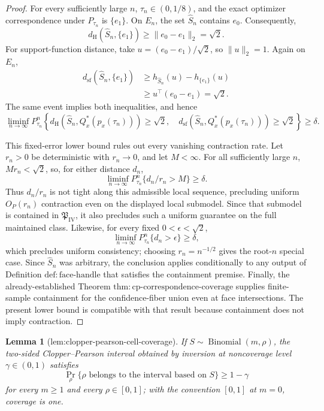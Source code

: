 \documentclass{article}
\newtheorem{lemma}{Lemma}
\begin{document}
\begin{proof}
For every sufficiently large \(n\), \(\tau_n\in(0,1/8)\), and the exact optimizer correspondence under \(P_{\tau_n}\) is \(\{e_1\}\).  On \(E_n\), the set \(\widehat S_n\) contains \(e_0\).  Consequently,
\[
 d_{\mathrm H}(\widehat S_n,\{e_1\})
 \geq\lVert e_0-e_1\rVert_2=\sqrt2.
\]
For support-function distance, take \(u=(e_0-e_1)/\sqrt2\), so \(\lVert u\rVert_2=1\).  Again on \(E_n\),
\[
 \begin{aligned}
 d_{\mathrm{sf}}(\widehat S_n,\{e_1\})
 &\geq h_{\widehat S_n}(u)-h_{\{e_1\}}(u)\\
 &\geq u^\top(e_0-e_1)=\sqrt2.
 \end{aligned}
\]
The same event implies both inequalities, and hence
\[
 \liminf_{n\to\infty}P_{\tau_n}^n\!\left\{
 d_{\mathrm H}(\widehat S_n,Q_x^*(p_x(\tau_n)))\geq\sqrt2,
 \quad
 d_{\mathrm{sf}}(\widehat S_n,Q_x^*(p_x(\tau_n)))\geq\sqrt2
 \right\}\geq\delta.
\]

This fixed-error lower bound rules out every vanishing contraction rate.  Let \(r_n>0\) be deterministic with \(r_n\to0\), and let \(M<\infty\).  For all sufficiently large \(n\), \(Mr_n<\sqrt2\), so, for either distance \(d_n\),
\[
 \liminf_{n\to\infty}P_{\tau_n}^n\{d_n/r_n>M\}\geq\delta.
\]
Thus \(d_n/r_n\) is not tight along this admissible local sequence, precluding uniform \(O_P(r_n)\) contraction even on the displayed local submodel.  Since that submodel is contained in \(\mathfrak P_{\mathrm{IV}}\), it also precludes such a uniform guarantee on the full maintained class.  Likewise, for every fixed \(0<\epsilon<\sqrt2\),
\[
 \liminf_{n\to\infty}P_{\tau_n}^n\{d_n>\epsilon\}\geq\delta,
\]
which precludes uniform consistency; choosing \(r_n=n^{-1/2}\) gives the root-\(n\) special case.  Since \(\widehat S_n\) was arbitrary, the conclusion applies conditionally to any output of Definition \(\mathrm{def{:}face\text{-}handle}\) that satisfies the containment premise.  Finally, the already-established Theorem \(\mathrm{thm{:}cp\text{-}correspondence\text{-}coverage}\) supplies finite-sample containment for the confidence-fiber union even at face intersections.  The present lower bound is compatible with that result because containment does not imply contraction.
\end{proof}

\begin{lemma}[lem:clopper-pearson-cell-coverage]\label{lem:clopper-pearson-cell-coverage}
If \(S\sim\operatorname{Binomial}(m,\rho)\), the two-sided Clopper--Pearson interval obtained by inversion at noncoverage level \(\gamma\in(0,1)\) satisfies
\[
 \Pr_\rho\{\rho\text{ belongs to the interval based on }S\}\geq1-\gamma
\]
for every \(m\geq1\) and every \(\rho\in[0,1]\); with the convention \([0,1]\) at \(m=0\), coverage is one.
\end{lemma}
\end{document}
